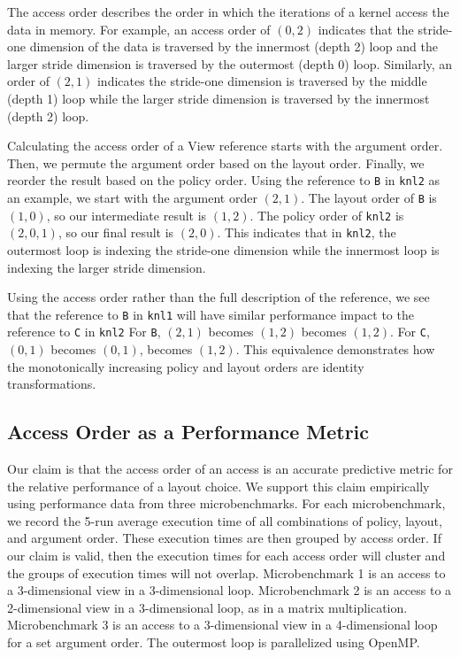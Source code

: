 \documentclass[sigconf]{acmart}
\begin{document}
The access order describes the order in which the iterations of a kernel access the data in memory.
For example, an access order of $(0,2)$ indicates that the stride-one dimension of the data is traversed by the innermost (depth 2) loop and the larger stride dimension is traversed by the outermost (depth 0) loop. 
Similarly, an order of $(2,1)$ indicates the stride-one dimension is traversed by the middle (depth 1) loop while the larger stride dimension is traversed by the innermost (depth 2) loop.

Calculating the access order of a View reference starts with the argument order.
Then, we permute the argument order based on the layout order. 
Finally, we reorder the result based on the policy order.
Using the reference to \verb.B. in \verb.knl2. as an example, we start with the argument order $(2,1)$.
The layout order of \verb.B. is $(1,0)$, so our intermediate result is $(1,2)$. 
The policy order of \verb.knl2. is $(2,0,1)$, so our final result is $(2,0)$. 
This indicates that in \verb.knl2., the outermost loop is indexing the stride-one dimension while the innermost loop is indexing the larger stride dimension.

Using the access order rather than the full description of the reference, we see that the reference to \verb.B. in \verb.knl1. will have similar performance impact to the reference to \verb.C. in \verb.knl2.
For \verb.B., $(2,1)$ becomes $(1,2)$ becomes $(1,2)$. 
For \verb.C., $(0,1)$ becomes $(0,1)$, becomes $(1,2)$.
This equivalence demonstrates how the monotonically increasing policy and layout orders are identity transformations.

\subsection{Access Order as a Performance Metric}
\label{sec:AccessMetric}
Our claim is that the access order of an access is an accurate predictive metric for the relative performance of a layout choice. 
We support this claim empirically using performance data from three microbenchmarks.
For each microbenchmark, we record the 5-run average execution time of all combinations of policy, layout, and argument order. 
These execution times are then grouped by access order.
If our claim is valid, then the execution times for each access order will cluster and the groups of execution times will not overlap.
Microbenchmark 1 is an access to a 3-dimensional view in a 3-dimensional loop. 
Microbenchmark 2 is an access to a 2-dimensional view in a 3-dimensional loop, as in a matrix multiplication.
Microbenchmark 3 is an access to a 3-dimensional view in a 4-dimensional loop for a set argument order.
The outermost loop is parallelized using OpenMP.
\end{document}

